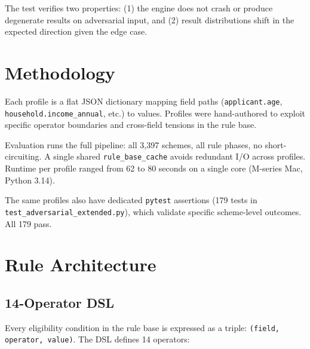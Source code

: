 \documentclass[11pt,a4paper]{article}
\newcommand{\ic}[1]{\texttt{\color{accent}#1}}
\begin{document}
The test verifies two properties: (1) the engine does not crash or produce degenerate results on adversarial input, and (2) result distributions shift in the expected direction given the edge case.


\section{Methodology}

Each profile is a flat JSON dictionary mapping field paths (\ic{applicant.age}, \ic{household.income\_annual}, etc.) to values. Profiles were hand-authored to exploit specific operator boundaries and cross-field tensions in the rule base.

Evaluation runs the full pipeline: all 3{,}397 schemes, all rule phases, no short-circuiting. A single shared \ic{rule\_base\_cache} avoids redundant I/O across profiles. Runtime per profile ranged from 62 to 80 seconds on a single core (M-series Mac, Python 3.14).

The same profiles also have dedicated \texttt{pytest} assertions (179 tests in \ic{test\_adversarial\_extended.py}), which validate specific scheme-level outcomes. All 179 pass.


\section{Rule Architecture}

\subsection{14-Operator DSL}

Every eligibility condition in the rule base is expressed as a triple: \ic{(field, operator, value)}. The DSL defines 14 operators:
\end{document}
